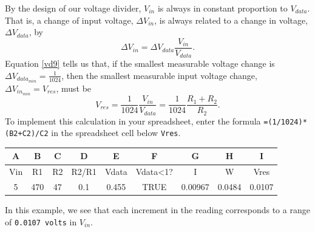 \begin{enumerate}
	\smallskip
	By the design of our voltage divider, $V_{in}$ is always in constant proportion to $V_{data}$.
	That is, a change of input voltage, $\Delta V_{in}$, is always related to a change in \adc voltage, $\Delta V_{data}$, by 
	\begin{equation}\label{vd9}
	\Delta V_{in} =  \Delta V_{data} \frac{V_{in}}{V_{data}}.
	\end{equation}
	Equation \ref{vd9} tells us that, if the smallest measurable \adc voltage change is $\Delta V_{data_{min}}=\frac{1}{1024}$, then the smallest measurable input voltage change, $\Delta V_{in_{min}}=V_{res}$, must be
	\begin{equation}\label{vd8}
	V_{res} = \frac{1}{1024} \frac{V_{in}}{V_{data}} = \frac{1}{1024} \frac{R_1+R_2}{R_2}.
\end{equation}
%	
%	
	To implement this calculation in your spreadsheet, enter the formula \lstinline{=(1/1024)*(B2+C2)/C2} in the spreadsheet cell below \texttt{Vres}.
	\begin{table}[H]
	\centering 
	\begin{small}
	\begin{tabular}{|c|c|c|c|c|c|c|c|c|}
		\hline 
		\textbf{A}  & \textbf{B} & \textbf{C} & \textbf{D} & \textbf{E} & \textbf{F} & \textbf{G} & \textbf{H} & \textbf{I} \\ 
		\hline 
		Vin  & R1 & R2 & R2/R1 & Vdata & Vdata<1? & I & W & Vres \\ 
		\hline 
		5 & 470  & 47 & 0.1 & 0.455 & TRUE & 0.00967 & 0.0484 & 0.0107 \\ 
		\hline 
	\end{tabular} 
	\end{small}
	\end{table}
	In this example, we see that each increment in the \adc reading corresponds to a range of \texttt{0.0107 volts} in $V_{in}$. 


\end{enumerate}
